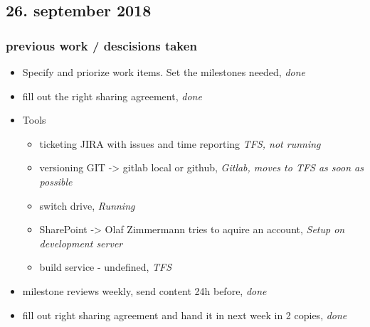 \subsection{26. september 2018}

\subsubsection{previous work / descisions taken}
\begin{itemize}
    \item Specify and priorize work items. Set the milestones needed, \textit{done}
    \item fill out the right sharing agreement, \textit{done}
    \item Tools
        \begin{itemize}
            \item ticketing JIRA with issues and time reporting \textit{TFS, not running}
            \item versioning GIT -> gitlab local or github, \textit{Gitlab, moves to TFS as soon as possible}
            \item switch drive, \textit{Running}
            \item SharePoint -> Olaf Zimmermann tries to aquire an account, \textit{Setup on development server}
            \item build service - undefined, \textit{TFS}
        \end{itemize}
        \item milestone reviews weekly, send content 24h before, \textit{done}
        \item fill out right sharing agreement and hand it in next week in 2 copies, \textit{done}
\end{itemize}

